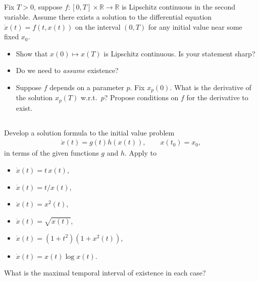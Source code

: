 \documentclass[12pt,a4paper]{article}
\newcommand{\from}{\colon}
\begin{document}
    \subsection{}
    
    Fix $T > 0$,
    suppose $f \from [0, T] \times \mathbb{R} \to \mathbb{R}$
    is Lipschitz continuous in the second variable.
    Assume there exists a solution to
    the differential equation 
    $\dot{x}(t) = f(t, x(t))$ on the interval $(0, T)$
    for any initial value near some fixed $x_0$.
    
    \begin{itemize}
    \item
        Show that 
        $x(0) \mapsto x(T)$
        is Lipschitz continuous.
        Is your statement sharp?
    \item
        Do we need to \emph{assume} existence?
    \item
        Suppose $f$ depends on a parameter $p$.
        Fix $x_p(0)$.
        What is the derivative of the solution $x_p(T)$ w.r.t.~$p$?
        Propose conditions on $f$ for the derivative to exist.
    \end{itemize}
    
    

    
    \subsection{}

    Develop a solution formula to
    the initial value problem
    \begin{align}
        \dot{x}(t) = g(t) h(x(t)),
        \qquad
        x(t_0) = x_0
        ,
    \end{align}
    in terms of the given functions $g$ and $h$.
    Apply to
    \begin{itemize}
    \item
        $\dot{x}(t) = t \, x(t)$,
    \item
        $\dot{x}(t) = t / x(t)$,
    \item
        $\dot{x}(t) = x^2(t)$,
    \item  
        $\dot{x}(t) = \sqrt{ x(t) }$,
    \item
        $\dot{x}(t) = (1 + t^2) (1 + x^2(t))$,
    \item
        $\dot{x}(t) = x(t) \log x(t)$.
    \end{itemize}
    What is the maximal temporal interval of existence in each case?
\end{document}
